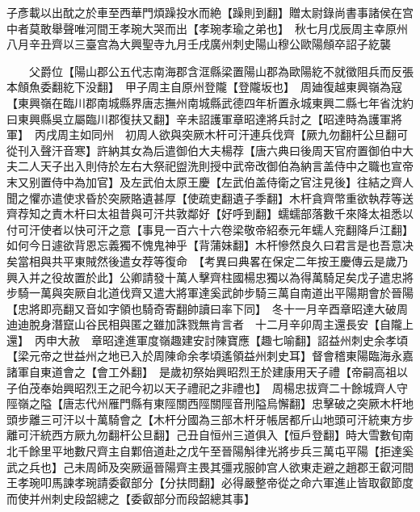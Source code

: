 子彥載以出酖之於車至西華門煩躁投水而絶【躁則到翻】贈太尉錄尚書事諸侯在宫中者莫敢舉聲唯河間王孝琬大哭而出【孝琬孝瑜之弟也】　秋七月戊辰周主幸原州　八月辛丑齊以三臺宫為大興聖寺九月壬戌廣州刺史陽山穆公歐陽頠卒詔子紇襲

　　父爵位【陽山郡公五代志南海郡含洭縣梁置陽山郡為歐陽紇不就徵阻兵而反張本頠魚委翻紇下没翻】　甲子周主自原州登隴【登隴坂也】　周廸復越東興嶺為寇【東興嶺在臨川郡南城縣界唐志撫州南城縣武德四年析置永城東興二縣七年省沈約曰東興縣吳立屬臨川郡復扶又翻】辛未詔護軍章昭達將兵討之【昭達時為護軍將軍】　丙戌周主如同州　初周人欲與突厥木杆可汗連兵伐齊【厥九勿翻杆公旦翻可從刊入聲汗音寒】許納其女為后遣御伯大夫楊荐【唐六典曰後周天官府置御伯中大夫二人天子出入則侍於左右大祭祀盥洗則授中武帝改御伯為納言盖侍中之職也宣帝末又别置侍中為加官】及左武伯太原王慶【左武伯盖侍衛之官注見後】往結之齊人聞之懼亦遣使求昏於突厥賂遺甚厚【使疏吏翻遺子季翻】木杆貪齊幣重欲執荐等送齊荐知之責木杆曰太祖昔與可汗共敦鄰好【好呼到翻】蠕蠕部落數千來降太祖悉以付可汗使者以快可汗之意【事見一百六十六卷梁敬帝紹泰元年蠕人兖翻降戶江翻】如何今日遽欲背恩忘義獨不愧鬼神乎【背蒲妹翻】木杆慘然良久曰君言是也吾意决矣當相與共平東賊然後遣女荐等復命　【考異曰典畧在保定二年按王慶傳云是歲乃興入并之役故置於此】公卿請發十萬人擊齊柱國楊忠獨以為得萬騎足矣戊子遣忠將步騎一萬與突厥自北道伐齊又遣大將軍達奚武帥步騎三萬自南道出平陽期會於晉陽【忠將即亮翻又音如字領也騎奇寄翻帥讀曰率下同】　冬十一月辛酉章昭達大破周迪迪脫身潛竄山谷民相與匿之雖加誅戮無肯言者　十二月辛卯周主還長安【自隴上還】　丙申大赦　章昭達進軍度嶺趣建安討陳寶應【趣七喻翻】詔益州刺史余孝頃【梁元帝之世益州之地已入於周陳命余孝頃遙領益州刺史耳】督會稽東陽臨海永嘉諸軍自東道會之【會工外翻】　是歲初祭始興昭烈王於建康用天子禮【帝嗣高祖以子伯茂奉始興昭烈王之祀今初以天子禮祀之非禮也】　周楊忠拔齊二十餘城齊人守陘嶺之隘【唐志代州雁門縣有東陘關西陘關陘音刑隘烏懈翻】忠擊破之突厥木杆地頭步離三可汗以十萬騎會之【木杆分國為三部木杆牙帳居都斤山地頭可汗統東方步離可汗統西方厥九勿翻杆公旦翻】己丑自恒州三道俱入【恒戶登翻】時大雪數旬南北千餘里平地數尺齊主自鄴倍道赴之戊午至晉陽斛律光將步兵三萬屯平陽【拒達奚武之兵也】己未周師及突厥逼晉陽齊主畏其彊戎服帥宫人欲東走避之趙郡王叡河間王孝琬叩馬諫孝琬請委叡部分【分扶問翻】必得嚴整帝從之命六軍進止皆取叡節度而使并州刺史段韶總之【委叡部分而段韶總其事】

